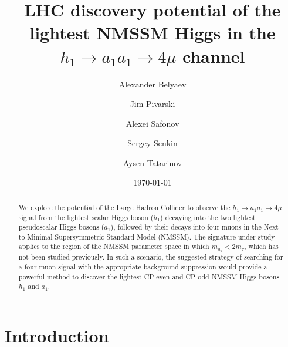 \documentclass[aps,prl,twocolumn,nofootinbib,superscriptaddress]{revtex4}
\begin{document}
\title{LHC discovery potential of the lightest NMSSM Higgs in the $h_1 \to a_1 a_1 \to 4\mu$ channel}
\date{\today}

\author{Alexander Belyaev}
\author{Jim Pivarski}
\author{Alexei Safonov}
\author{Sergey Senkin}
\author{Aysen Tatarinov}

\begin{abstract}
We explore the potential of the Large Hadron Collider to observe the
$h_1\to a_1a_1\to 4\mu$ signal from the lightest scalar Higgs boson
($h_1$) decaying into the two lightest pseudoscalar Higgs bosons
($a_1$), followed by their decays into four muons in the Next-to-Minimal
Supersymmetric Standard Model (NMSSM). The signature under study
applies to the region of the NMSSM parameter space in which $m_{a_1} <
2 m_\tau$, which has not been studied previously. In such a scenario,
the suggested strategy of searching for a four-muon signal with the
appropriate background suppression would provide a powerful method to
discover the lightest CP-even and CP-odd NMSSM Higgs bosons $h_1$ and
$a_1$.
\end{abstract}

\maketitle

\section{Introduction}
\end{document}

